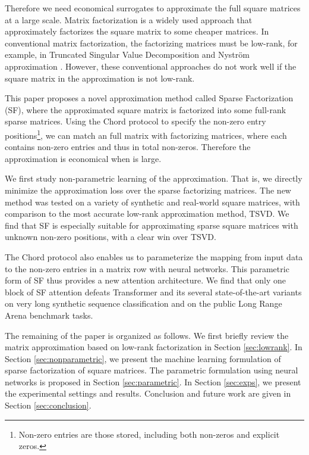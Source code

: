 \documentclass{article}
\begin{document}
Therefore we need economical surrogates to approximate the full square matrices at a large scale. Matrix factorization is a widely used approach that approximately factorizes the square matrix to some cheaper matrices. In conventional matrix factorization, the factorizing matrices must be low-rank, for example, in Truncated Singular Value Decomposition and Nystr\"o{}m approximation \citep{nystrom1,nystrom2}. However, these conventional approaches do not work well if the square matrix in the approximation is not low-rank.

This paper proposes a novel approximation method called Sparse Factorization (SF), where the approximated square matrix is factorized into some full-rank sparse matrices. Using the Chord protocol \citep{chord} to specify the non-zero entry positions\footnote{Non-zero entries are those stored, including both non-zeros and explicit zeros.}, we can match an  full matrix with  factorizing matrices, where each contains  non-zero entries and thus in total  non-zeros. Therefore the approximation is economical when  is large.

We first study non-parametric learning of the approximation. That is, we directly minimize the approximation loss over the sparse factorizing matrices. The new method was tested on a variety of synthetic and real-world square matrices, with comparison to the most accurate low-rank approximation method, TSVD. We find that SF is especially suitable for approximating sparse square matrices with unknown non-zero positions, with a clear win over TSVD.

The Chord protocol also enables us to parameterize the mapping from input data to the non-zero entries in a matrix row with neural networks. This parametric form of SF thus provides a new attention architecture. We find that only one block of SF attention defeats Transformer and its several state-of-the-art variants on very long synthetic sequence classification and on the public Long Range Arena benchmark tasks.

The remaining of the paper is organized as follows. We first briefly review the matrix approximation based on low-rank factorization in Section \ref{sec:lowrank}. In Section \ref{sec:nonparametric}, we present the machine learning formulation of sparse factorization of square matrices. The parametric formulation using neural networks is proposed in Section \ref{sec:parametric}. In Section \ref{sec:exps}, we present the experimental settings and results. Conclusion and future work are given in Section \ref{sec:conclusion}.
\end{document}
